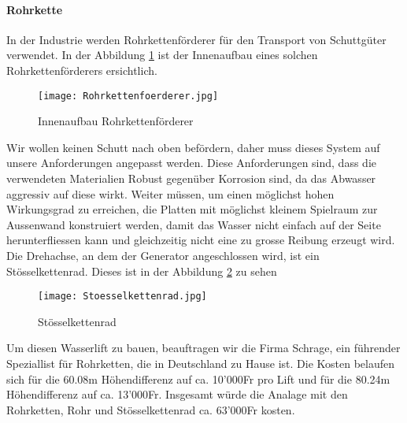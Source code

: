 \paragraph{Rohrkette}

In der Industrie werden Rohrkettenförderer für den Transport von Schuttgüter verwendet. In der Abbildung \ref{fig:Rohrkettenfoerderer}  ist der Innenaufbau eines solchen Rohrkettenförderers ersichtlich.

\begin{figure} [H]
	\centering
	\texttt{[image: Rohrkettenfoerderer.jpg]}
	\caption{Innenaufbau Rohrkettenförderer \cite{abconvey}}
	\label{fig:Rohrkettenfoerderer}
\end{figure}

Wir wollen keinen Schutt nach oben befördern, daher muss dieses System auf unsere Anforderungen angepasst werden. Diese Anforderungen sind, dass die verwendeten Materialien Robust gegenüber Korrosion sind, da das Abwasser aggressiv auf diese wirkt. Weiter müssen, um einen möglichst hohen Wirkungsgrad zu erreichen, die Platten mit möglichst kleinem Spielraum zur Aussenwand konstruiert werden, damit das Wasser nicht einfach auf der Seite herunterfliessen kann und gleichzeitig nicht eine zu grosse Reibung erzeugt wird. Die Drehachse, an dem der Generator angeschlossen wird, ist ein Stösselkettenrad. Dieses ist in der Abbildung \ref{fig:stoesselkettenrad}  zu sehen

\begin{figure} [H]
	\centering
	\texttt{[image: Stoesselkettenrad.jpg]}
	\caption{Stösselkettenrad \cite{schrage}}
	\label{fig:stoesselkettenrad}
\end{figure}


Um diesen Wasserlift zu bauen, beauftragen wir die Firma Schrage, ein führender Speziallist für Rohrketten, die in Deutschland zu Hause ist. Die Kosten belaufen sich für die 60.08\si{m} Höhendifferenz auf ca. 10'000\si{Fr} pro Lift und für die 80.24\si{m} Höhendifferenz auf ca. 13'000\si{Fr}. Insgesamt würde die Analage mit den Rohrketten, Rohr und Stösselkettenrad ca. 63'000\si{Fr} kosten. \cite{schrage}

\newpage

